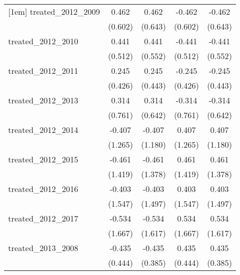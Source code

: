 {\begin{tabular}{l*{4}{c}}
[1em]
treated\_2012\_2009&       0.462         &       0.462         &      -0.462         &      -0.462         \\
            &     (0.602)         &     (0.643)         &     (0.602)         &     (0.643)         \\
[1em]
treated\_2012\_2010&       0.441         &       0.441         &      -0.441         &      -0.441         \\
            &     (0.512)         &     (0.552)         &     (0.512)         &     (0.552)         \\
[1em]
treated\_2012\_2011&       0.245         &       0.245         &      -0.245         &      -0.245         \\
            &     (0.426)         &     (0.443)         &     (0.426)         &     (0.443)         \\
[1em]
treated\_2012\_2013&       0.314         &       0.314         &      -0.314         &      -0.314         \\
            &     (0.761)         &     (0.642)         &     (0.761)         &     (0.642)         \\
[1em]
treated\_2012\_2014&      -0.407         &      -0.407         &       0.407         &       0.407         \\
            &     (1.265)         &     (1.180)         &     (1.265)         &     (1.180)         \\
[1em]
treated\_2012\_2015&      -0.461         &      -0.461         &       0.461         &       0.461         \\
            &     (1.419)         &     (1.378)         &     (1.419)         &     (1.378)         \\
[1em]
treated\_2012\_2016&      -0.403         &      -0.403         &       0.403         &       0.403         \\
            &     (1.547)         &     (1.497)         &     (1.547)         &     (1.497)         \\
[1em]
treated\_2012\_2017&      -0.534         &      -0.534         &       0.534         &       0.534         \\
            &     (1.667)         &     (1.617)         &     (1.667)         &     (1.617)         \\
[1em]
treated\_2013\_2008&      -0.435         &      -0.435         &       0.435         &       0.435         \\
            &     (0.444)         &     (0.385)         &     (0.444)         &     (0.385)         \\

\end{tabular}}
